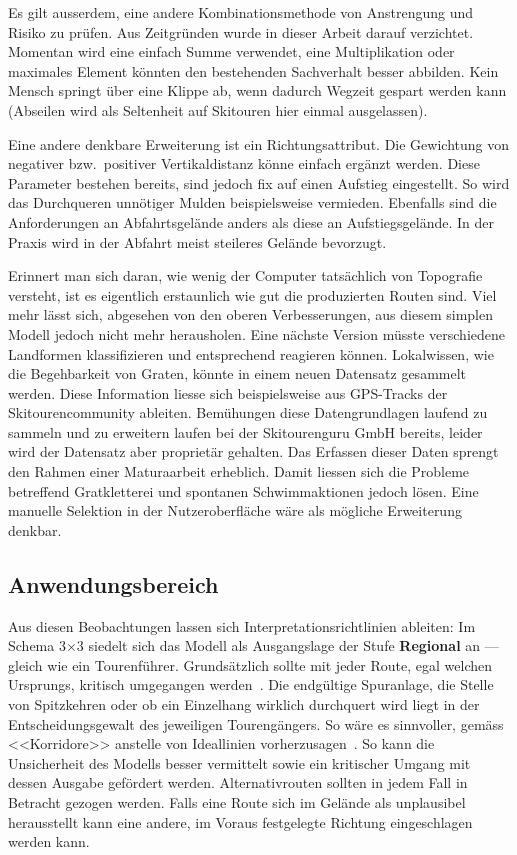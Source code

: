Es gilt ausserdem, eine andere Kombinationsmethode von Anstrengung und Risiko zu prüfen. Aus Zeitgründen wurde in dieser Arbeit darauf verzichtet. Momentan wird eine einfach Summe verwendet, eine Multiplikation oder maximales Element könnten den bestehenden Sachverhalt besser abbilden. Kein Mensch springt über eine Klippe ab, wenn dadurch Wegzeit gespart werden kann (Abseilen wird als Seltenheit auf Skitouren hier einmal ausgelassen).

Eine andere denkbare Erweiterung ist ein Richtungsattribut. Die Gewichtung von negativer bzw.\ positiver Vertikaldistanz könne einfach ergänzt werden. Diese Parameter bestehen bereits, sind jedoch fix auf einen Aufstieg eingestellt. So wird das Durchqueren unnötiger Mulden beispielsweise vermieden. Ebenfalls sind die Anforderungen an Abfahrtsgelände anders als diese an Aufstiegsgelände. In der Praxis wird in der Abfahrt meist steileres Gelände bevorzugt.

Erinnert man sich daran, wie wenig der Computer tatsächlich von Topografie versteht, ist es eigentlich erstaunlich wie gut die produzierten Routen sind. Viel mehr lässt sich, abgesehen von den oberen Verbesserungen, aus diesem simplen Modell jedoch nicht mehr herausholen. Eine nächste Version müsste verschiedene Landformen klassifizieren und entsprechend reagieren können. Lokalwissen, wie die Begehbarkeit von Graten, könnte in einem neuen Datensatz gesammelt werden. Diese Information liesse sich beispielsweise aus GPS-Tracks der Skitourencommunity ableiten. Bemühungen diese Datengrundlagen laufend zu sammeln und zu erweitern laufen bei der Skitourenguru GmbH bereits, leider wird der Datensatz aber proprietär gehalten. Das Erfassen dieser Daten sprengt den Rahmen einer Maturaarbeit erheblich. Damit liessen sich die Probleme betreffend Gratkletterei und spontanen Schwimmaktionen jedoch lösen.  Eine manuelle Selektion in der Nutzeroberfläche wäre als mögliche Erweiterung denkbar.

\clearpage
\subsection{Anwendungsbereich}

Aus diesen Beobachtungen lassen sich Interpretationsrichtlinien ableiten:
Im Schema 3$\times$3 siedelt sich das Modell als Ausgangslage der Stufe \textbf{Regional} an --- gleich wie ein Tourenführer. Grundsätzlich sollte mit jeder Route, egal welchen Ursprungs, kritisch umgegangen werden~\cite{sacbergspwinter}. Die endgültige Spuranlage, die Stelle von Spitzkehren oder ob ein Einzelhang wirklich durchquert wird liegt in der Entscheidungsgewalt des jeweiligen Tourengängers. So wäre es sinnvoller, gemäss \citeauthor{eisenhuttourknopfdruck} <<Korridore>> anstelle von Ideallinien vorherzusagen~\cite{eisenhuttourknopfdruck}. So kann die Unsicherheit des Modells besser vermittelt sowie ein kritischer Umgang mit dessen Ausgabe gefördert werden. Alternativrouten sollten in jedem Fall in Betracht gezogen werden. Falls eine Route sich im Gelände als unplausibel herausstellt kann eine andere, im Voraus festgelegte Richtung eingeschlagen werden kann.


